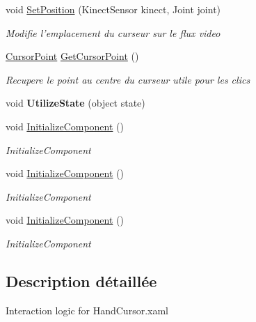 \begin{DoxyCompactItemize}
\item 
void \hyperlink{class_w_p_f_page_switch_1_1_hand_cursor_ae80307269ab1f33db59a2f8e11def34f}{Set\+Position} (Kinect\+Sensor kinect, Joint joint)
\begin{DoxyCompactList}\small\item\em Modifie l'emplacement du curseur sur le flux video \end{DoxyCompactList}\item 
\hyperlink{class_w_p_f_page_switch_1_1_cursor_point}{Cursor\+Point} \hyperlink{class_w_p_f_page_switch_1_1_hand_cursor_ad7074656c59dc487a0e127f9c502fe2b}{Get\+Cursor\+Point} ()
\begin{DoxyCompactList}\small\item\em Recupere le point au centre du curseur utile pour les clics \end{DoxyCompactList}\item 
\hypertarget{class_w_p_f_page_switch_1_1_hand_cursor_a04fa97fc61c32a26590b7c607bb426ef}{void {\bfseries Utilize\+State} (object state)}\label{class_w_p_f_page_switch_1_1_hand_cursor_a04fa97fc61c32a26590b7c607bb426ef}

\item 
void \hyperlink{class_w_p_f_page_switch_1_1_hand_cursor_a35ac305d808a5b3259859d36a1013492}{Initialize\+Component} ()
\begin{DoxyCompactList}\small\item\em Initialize\+Component \end{DoxyCompactList}\item 
void \hyperlink{class_w_p_f_page_switch_1_1_hand_cursor_a35ac305d808a5b3259859d36a1013492}{Initialize\+Component} ()
\begin{DoxyCompactList}\small\item\em Initialize\+Component \end{DoxyCompactList}\item 
void \hyperlink{class_w_p_f_page_switch_1_1_hand_cursor_a35ac305d808a5b3259859d36a1013492}{Initialize\+Component} ()
\begin{DoxyCompactList}\small\item\em Initialize\+Component \end{DoxyCompactList}\end{DoxyCompactItemize}


\subsection{Description détaillée}
Interaction logic for Hand\+Cursor.\+xaml 

